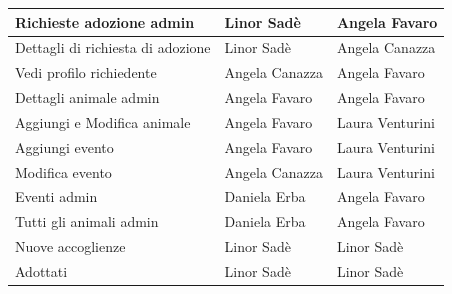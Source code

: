 \begin{center}
\begin{tabular}{|l|l|l|}
Richieste adozione admin & Linor Sadè & Angela Favaro \\
\hline
\rowcolor{beige}
Dettagli di richiesta di adozione & Linor Sadè &  Angela Canazza\\
\hline
\rowcolor{beige}
Vedi profilo richiedente & Angela Canazza & Angela Favaro \\
\hline
\rowcolor{beige}
Dettagli animale admin & Angela Favaro & Angela Favaro \\
\hline
\rowcolor{beige}
Aggiungi e Modifica animale  & Angela Favaro & Laura Venturini \\
\hline
\rowcolor{beige}
Aggiungi evento  & Angela Favaro & Laura Venturini \\
\hline
\rowcolor{beige}
Modifica evento  & Angela Canazza & Laura Venturini \\
\hline
\rowcolor{beige}
Eventi admin  & Daniela Erba & Angela Favaro \\
\hline
\rowcolor{beige}
Tutti gli animali admin & Daniela Erba & Angela Favaro \\
\hline
\rowcolor{beige}
Nuove accoglienze & Linor Sadè & Linor Sadè \\
\hline
\rowcolor{beige}
Adottati & Linor Sadè & Linor Sadè \\
\hline
\end{tabular}
\end{center}
